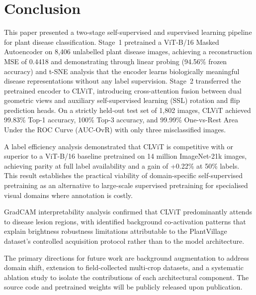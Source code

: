 \documentclass[conference]{IEEEtran}
\begin{document}
\section{Conclusion}

This paper presented a two-stage self-supervised and supervised learning pipeline for plant disease classification. Stage~1 pretrained a ViT-B/16 Masked Autoencoder on 8,406 unlabelled plant disease images, achieving a reconstruction MSE of 0.4418 and demonstrating through linear probing (94.56\% frozen accuracy) and t-SNE analysis that the encoder learns biologically meaningful disease representations without any label supervision. Stage~2 transferred the pretrained encoder to CLViT, introducing cross-attention fusion between dual geometric views and auxiliary self-supervised learning (SSL) rotation and flip prediction heads. On a strictly held-out test set of 1,802 images, CLViT achieved 99.83\% Top-1 accuracy, 100\% Top-3 accuracy, and 99.99\% One-vs-Rest Area Under the ROC Curve (AUC-OvR) with only three misclassified images.

A label efficiency analysis demonstrated that CLViT is competitive with or superior to a ViT-B/16 baseline pretrained on 14 million ImageNet-21k images, achieving parity at full label availability and a gain of +0.22\% at 50\% labels. This result establishes the practical viability of domain-specific self-supervised pretraining as an alternative to large-scale supervised pretraining for specialised visual domains where annotation is costly.

GradCAM interpretability analysis confirmed that CLViT predominantly attends to disease lesion regions, with identified background co-activation patterns that explain brightness robustness limitations attributable to the PlantVillage dataset's controlled acquisition protocol rather than to the model architecture.

The primary directions for future work are background augmentation to address domain shift, extension to field-collected multi-crop datasets, and a systematic ablation study to isolate the contributions of each architectural component. The source code and pretrained weights will be publicly released upon publication.



\end{document}
